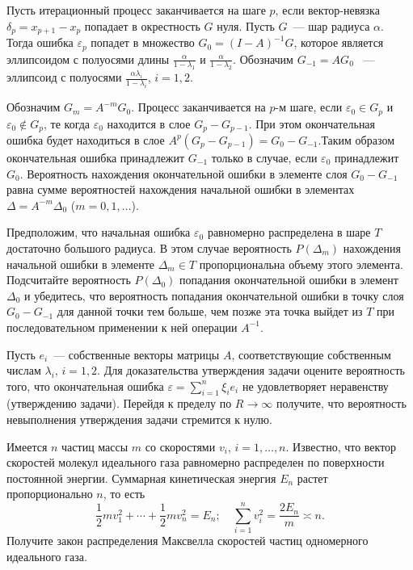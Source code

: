 \begin{remark}
Пусть итерационный процесс заканчивается на шаге $p$, если вектор-невязка $\delta_p=x_{p+1}-x_p$ попадает в окрестность $G$ нуля. Пусть $G$~--- шар радиуса $\alpha$. Тогда ошибка $\varepsilon_p$ попадет в множество $G_0 = (I-A)^{-1}G$, которое является эллипсоидом с полуосями длины $\frac{\alpha}{1-\lambda_1}$ и $\frac{\alpha}{1-\lambda_2}$.
Обозначим $G_{-1}=AG_0$ ~--- эллипсоид с полуосями $\frac{\alpha\lambda_i}{1-\lambda_i}$, $i=1,2$. 
 

Обозначим $G_m = A^{-m}G_0$. Процесс заканчивается на $p$-м шаге, если $\varepsilon_0\in G_p$ и $\varepsilon_0\not\in G_p$, те когда $\varepsilon_0$ находится в слое $G_p-G_{p-1}$.
При этом окончательная ошибка будет находиться в слое $A^{p}(G_p-G_{p-1}) = G_0-G_{-1}$.Таким образом окончательная ошибка принадлежит $G_{-1}$ только в случае, если $\varepsilon_0$ принадлежит $G_0$. 
Вероятность нахождения окончательной ошибки в элементе слоя $G_0-G_{-1}$ равна сумме вероятностей нахождения начальной ошибки в элементах $\Delta=A^{-m}\Delta_0$ ($m=0,1,\dots$).

Предположим, что начальная ошибка $\varepsilon_0$ равномерно распределена в шаре $T$ достаточно большого радиуса. В этом случае вероятность $P(\Delta_m)$ нахождения начальной ошибки в элементе $\Delta_m\in T$ пропорциональна объему этого элемента. Подсчитайте вероятность $P(\Delta_0)$ попадания окончательной ошибки в элемент $\Delta_0$ и убедитесь, что вероятность попадания окончательной ошибки в точку слоя $G_0-G_{-1}$ для данной точки тем больше, чем позже эта точка выйдет из $T$ при последовательном применении к ней операции $A^{-1}$. 

Пусть $e_i$~--- собственные векторы матрицы $A$, соответствующие собственным числам $\lambda_i$, $i=1,2$.
Для доказательства утверждения задачи оцените вероятность того, что окончательная ошибка $\varepsilon = \sum_{i=1}^n\xi_ie_i$ не удовлетворяет неравенству (утверждению задачи). Перейдя к пределу по $R\to\infty$ получите, что вероятность невыполнения утверждения задачи стремится к нулю.


\end{remark}


\begin{problem}
Имеется $n$ частиц массы $m$  со скоростями $v_i$, $i=1,\dots,n$. Известно, что вектор скоростей молекул идеального газа равномерно
распределен по поверхности постоянной энергии. Суммарная кинетическая энергия $E_n$ растет пропорционально $n$, то есть 
\begin{equation*}
\frac{1}{2}mv_1^2+\cdots+\frac{1}{2}m v_n^2 = E_n;\quad \sum_{i=1}^n v^2_i=\frac{2E_n}{m}\asymp n.
\end{equation*}
Получите закон распределения Максвелла скоростей частиц одномерного идеального газа. 
\end{problem}

